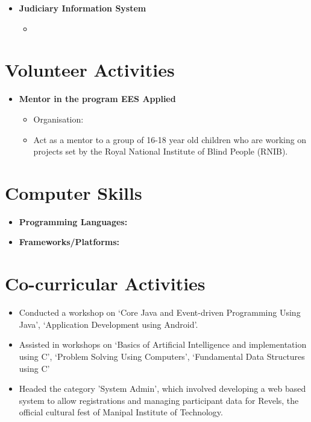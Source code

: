 \documentclass[11pt]{article}
\begin{document}
\begin{itemize}
	\item \bf{Judiciary Information System}
	\begin{itemize}
        \item[] 
	\end{itemize}
\end{itemize}

\section*{Volunteer Activities}
\begin{itemize}
	\item\bf{Mentor in the program EES Applied}
	\begin{itemize}
		\item[] Organisation: 
		\item[] Act as a mentor to a group of 16-18 year old children who are working on projects set by the Royal National Institute of Blind People (RNIB).
	\end{itemize}
\end{itemize}

\section*{Computer Skills}
\begin{itemize}
    \item \bf{Programming Languages}: 
	\item \bf{Frameworks/Platforms}: 
\end{itemize}

\section*{Co-curricular Activities}
\begin{itemize}
	\item[] Conducted a workshop on ‘Core Java and Event-driven Programming Using Java’, ‘Application Development using Android’.
	\item[] Assisted in workshops on ‘Basics of Artificial Intelligence and implementation using C’, ‘Problem Solving Using Computers’, ‘Fundamental Data Structures using C’
	\item[] Headed the category ’System Admin’, which involved developing a web based system to allow registrations and managing participant data for Revels, the official cultural fest of Manipal Institute of Technology.
\end{itemize}
\end{document}

